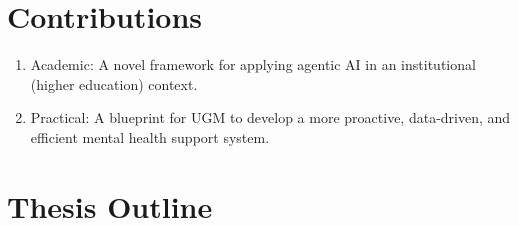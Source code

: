 
\section{Contributions}
\label{sec:contributions}

\begin{enumerate}
    \item Academic: A novel framework for applying agentic AI in an institutional (higher education) context.
    \item Practical: A blueprint for UGM to develop a more proactive, data-driven, and efficient mental health support system.
\end{enumerate}




\section{Thesis Outline}
\label{sec:thesis_outline}

